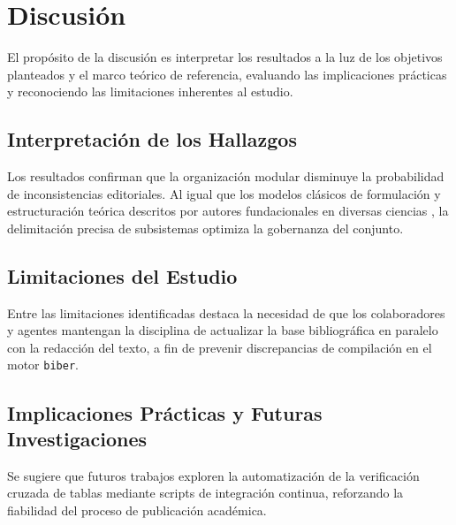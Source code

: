\section{Discusión}

El propósito de la discusión es interpretar los resultados a la luz de los objetivos planteados y el marco teórico de referencia, evaluando las implicaciones prácticas y reconociendo las limitaciones inherentes al estudio.

\subsection{Interpretación de los Hallazgos}
Los resultados confirman que la organización modular disminuye la probabilidad de inconsistencias editoriales. Al igual que los modelos clásicos de formulación y estructuración teórica descritos por autores fundacionales en diversas ciencias \parencite{einstein1905}, la delimitación precisa de subsistemas optimiza la gobernanza del conjunto.

\subsection{Limitaciones del Estudio}
Entre las limitaciones identificadas destaca la necesidad de que los colaboradores y agentes mantengan la disciplina de actualizar la base bibliográfica en paralelo con la redacción del texto, a fin de prevenir discrepancias de compilación en el motor \texttt{biber}.

\subsection{Implicaciones Prácticas y Futuras Investigaciones}
Se sugiere que futuros trabajos exploren la automatización de la verificación cruzada de tablas mediante scripts de integración continua, reforzando la fiabilidad del proceso de publicación académica.
